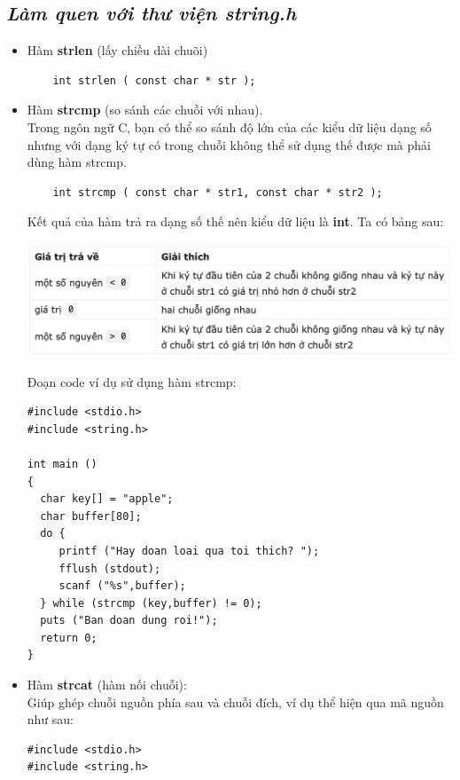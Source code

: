 \documentclass[12pt,a4paper]{article}
\begin{document}
\begin{center}
\subsection*{\textit{Làm quen với thư viện string.h}} 	
\end{center}
\begin{itemize}
	\item Hàm \textbf{strlen} (lấy chiều dài chuõi)\\
\begin{lstlisting}
	int strlen ( const char * str );
\end{lstlisting}
	\item Hàm \textbf{strcmp} (so sánh các chuỗi với nhau).\\ Trong ngôn ngữ C, bạn có thể so sánh độ lớn của các kiểu dữ liệu dạng số nhưng với dạng ký tự có trong chuỗi không thể sử dụng thế được mà phải dùng hàm strcmp.\\
\begin{lstlisting}
	int strcmp ( const char * str1, const char * str2 );
\end{lstlisting}
Kết quả của hàm trả ra dạng số thế nên kiểu dữ liệu là \textbf{int}. Ta có bảng sau:\\
\begin{center}
	\includegraphics[scale = 0.57]{comparestring.png}
\end{center}
Đoạn code ví dụ sử dụng hàm strcmp:\\
\begin{lstlisting}
#include <stdio.h>
#include <string.h>
 
int main ()
{
  char key[] = "apple";
  char buffer[80];
  do {
     printf ("Hay doan loai qua toi thich? ");
     fflush (stdout);
     scanf ("%s",buffer);
  } while (strcmp (key,buffer) != 0);
  puts ("Ban doan dung roi!");
  return 0;
}
\end{lstlisting}
	\item Hàm \textbf{strcat} (hàm nối chuỗi):\\
Giúp ghép chuỗi nguồn phía sau và chuỗi đích, ví dụ thể hiện qua mã nguồn như sau:
\begin{lstlisting}
#include <stdio.h>
#include <string.h>
 

\end{lstlisting}
\end{itemize}
\end{document}

